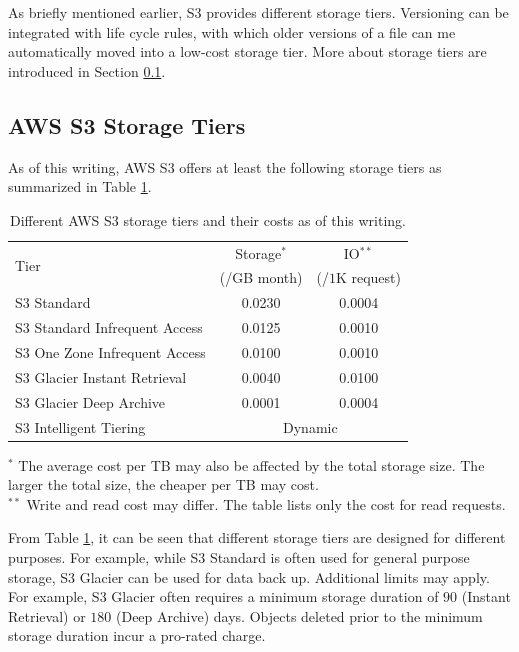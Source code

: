 As briefly mentioned earlier, S3 provides different storage tiers. Versioning can be integrated with life cycle rules, with which older versions of a file can me automatically moved into a low-cost storage tier. More about storage tiers are introduced in Section \ref{apsec:aws-s3-storage-tier}.

\subsection{AWS S3 Storage Tiers} \label{apsec:aws-s3-storage-tier}

As of this writing, AWS S3 offers at least the following storage tiers as summarized in Table \ref{tab:s3tiers}.

\begin{table}[!htb]
	\centering
	\caption{Different AWS S3 storage tiers and their costs as of this writing.} \label{tab:s3tiers}
	\begin{tabularx}{\textwidth}{lcc}
		\hline
		\multirow{2}{*}{Tier} & Storage$^*$ & IO$^{**}$   \\ 
		& (/GB month) & (/$1$K request) \\ \hline
		S3 Standard & 0.0230 & 0.0004 \\
		S3 Standard Infrequent Access & 0.0125 & 0.0010  \\
		S3 One Zone Infrequent Access & 0.0100 & 0.0010 \\
		S3 Glacier Instant Retrieval & 0.0040 & 0.0100 \\
		S3 Glacier Deep Archive & 0.0001 & 0.0004 \\
		S3 Intelligent Tiering & \multicolumn{2}{c}{Dynamic} \\
		\hline
	\end{tabularx}
	\begin{flushleft}
		\footnotesize
		$^*$ The average cost per TB may also be affected by the total storage size. The larger the total size, the cheaper per TB may cost. \\
		$^{**}$ Write and read cost may differ. The table lists only the cost for read requests.
	\end{flushleft}
\end{table}

From Table \ref{tab:s3tiers}, it can be seen that different storage tiers are designed for different purposes. For example, while S3 Standard is often used for general purpose storage, S3 Glacier can be used for data back up. Additional limits may apply. For example, S3 Glacier often requires a minimum storage duration of $90$ (Instant Retrieval) or $180$ (Deep Archive) days. Objects deleted prior to the minimum storage duration incur a pro-rated charge.


